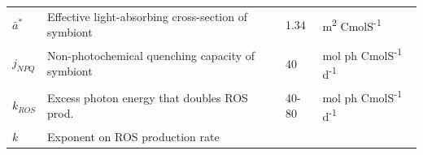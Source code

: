 \documentclass[]{elsarticle} %
\begin{document}
\begin{longtable}[c]{@{}llll@{}}
\begin{minipage}[t]{0.10\columnwidth}\raggedright\strut
\(\bar{a}^*\)
\strut\end{minipage} &
\begin{minipage}[t]{0.48\columnwidth}\raggedright\strut
Effective light-absorbing cross-section of symbiont
\strut\end{minipage} &
\begin{minipage}[t]{0.09\columnwidth}\raggedright\strut
1.34
\strut\end{minipage} &
\begin{minipage}[t]{0.23\columnwidth}\raggedright\strut
m\textsuperscript{2} CmolS\textsuperscript{-1}
\strut\end{minipage}\tabularnewline
\begin{minipage}[t]{0.10\columnwidth}\raggedright\strut
\(j_{NPQ}\)
\strut\end{minipage} &
\begin{minipage}[t]{0.48\columnwidth}\raggedright\strut
Non-photochemical quenching capacity of symbiont
\strut\end{minipage} &
\begin{minipage}[t]{0.09\columnwidth}\raggedright\strut
40
\strut\end{minipage} &
\begin{minipage}[t]{0.23\columnwidth}\raggedright\strut
mol ph CmolS\textsuperscript{-1} d\textsuperscript{-1}
\strut\end{minipage}\tabularnewline
\begin{minipage}[t]{0.10\columnwidth}\raggedright\strut
\(k_{ROS}\)
\strut\end{minipage} &
\begin{minipage}[t]{0.48\columnwidth}\raggedright\strut
Excess photon energy that doubles ROS prod.
\strut\end{minipage} &
\begin{minipage}[t]{0.09\columnwidth}\raggedright\strut
40-80
\strut\end{minipage} &
\begin{minipage}[t]{0.23\columnwidth}\raggedright\strut
mol ph CmolS\textsuperscript{-1} d\textsuperscript{-1}
\strut\end{minipage}\tabularnewline
\begin{minipage}[t]{0.10\columnwidth}\raggedright\strut
\(k\)
\strut\end{minipage} &
\begin{minipage}[t]{0.48\columnwidth}\raggedright\strut
Exponent on ROS production rate
\strut\end{minipage} &

\end{longtable}
\end{document}
